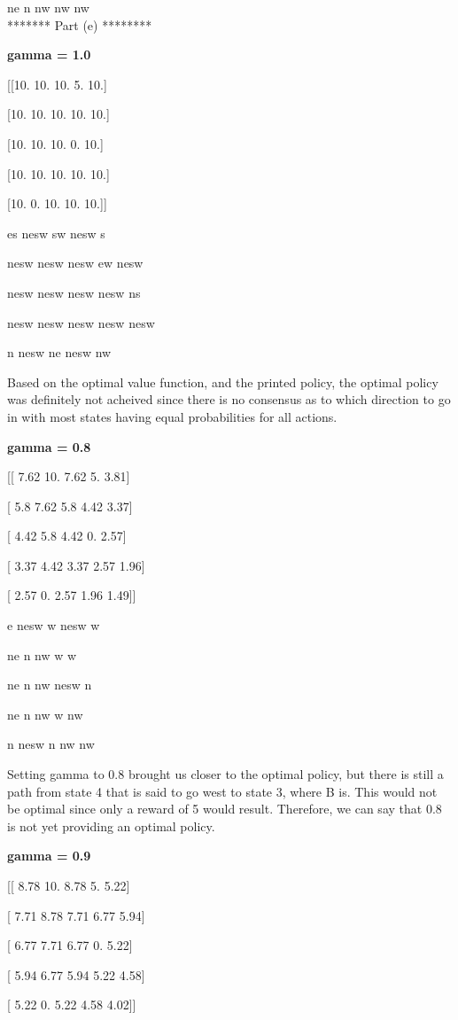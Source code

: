 \documentclass[11pt]{article}
\begin{document}
ne n nw nw nw\\

******* Part (e) ********

\textbf{gamma = 1.0}

[[10. 10. 10.  5. 10.]

 [10. 10. 10. 10. 10.]
 
 [10. 10. 10.  0. 10.]
 
 [10. 10. 10. 10. 10.]
 
 [10.  0. 10. 10. 10.]]
 
es nesw sw nesw s 

nesw nesw nesw ew nesw 

nesw nesw nesw nesw ns 

nesw nesw nesw nesw nesw 

n nesw ne nesw nw 

Based on the optimal value function, and the printed policy, the optimal policy was definitely not acheived since there is no consensus as to which direction to go in with most states having equal probabilities for all actions.

\textbf{gamma = 0.8}

[[ 7.62 10.    7.62  5.    3.81]

 [ 5.8   7.62  5.8   4.42  3.37]
 
 [ 4.42  5.8   4.42  0.    2.57]
 
 [ 3.37  4.42  3.37  2.57  1.96]
 
 [ 2.57  0.    2.57  1.96  1.49]]
 
e nesw w nesw w 

ne n nw w w 

ne n nw nesw n 

ne n nw w nw 

n nesw n nw nw 

Setting gamma to 0.8 brought us closer to the optimal policy, but there is still a path from state 4 that is said to go west to state 3, where B is. This would not be optimal since only a reward of 5 would result. Therefore, we can say that 0.8 is not yet providing an optimal policy.

\textbf{gamma = 0.9}

[[ 8.78 10.    8.78  5.    5.22]

 [ 7.71  8.78  7.71  6.77  5.94]
 
 [ 6.77  7.71  6.77  0.    5.22]
 
 [ 5.94  6.77  5.94  5.22  4.58]
 
 [ 5.22  0.    5.22  4.58  4.02]]
 
\end{document}
